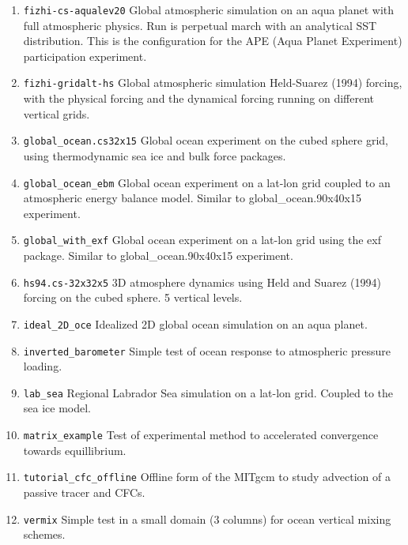 \begin{enumerate}
\item \texttt{fizhi-cs-aqualev20} Global atmospheric simulation on an
  aqua planet with full atmospheric physics. Run is perpetual march
  with an analytical SST distribution.  This is the configuration for
  the APE (Aqua Planet Experiment) participation experiment.

\item \texttt{fizhi-gridalt-hs} Global atmospheric simulation
  Held-Suarez (1994) forcing, with the physical forcing and the
  dynamical forcing running on different vertical grids.

\item \texttt{global\_ocean.cs32x15} Global ocean experiment on the
  cubed sphere grid, using thermodynamic sea ice and bulk force
  packages.

\item \texttt{global\_ocean\_ebm} Global ocean experiment on a lat-lon
  grid coupled to an atmospheric energy balance model. Similar to
  global\_ocean.90x40x15 experiment.

\item \texttt{global\_with\_exf} Global ocean experiment on a lat-lon
  grid using the exf package. Similar to global\_ocean.90x40x15
  experiment.

\item \texttt{hs94.cs-32x32x5} 3D atmosphere dynamics using Held and
  Suarez (1994) forcing on the cubed sphere. 5 vertical levels.

\item \texttt{ideal\_2D\_oce} Idealized 2D global ocean simulation on
  an aqua planet.

\item \texttt{inverted\_barometer} Simple test of ocean response to
  atmospheric pressure loading.

\item \texttt{lab\_sea} Regional Labrador Sea simulation on a lat-lon
  grid. Coupled to the sea ice model.

\item \texttt{matrix\_example} Test of experimental method to
  accelerated convergence towards equillibrium.

\item \texttt{tutorial\_cfc\_offline} Offline form of the MITgcm to
  study advection of a passive tracer and CFCs.

\item \texttt{vermix} Simple test in a small domain (3 columns) for
  ocean vertical mixing schemes.

\end{enumerate}

